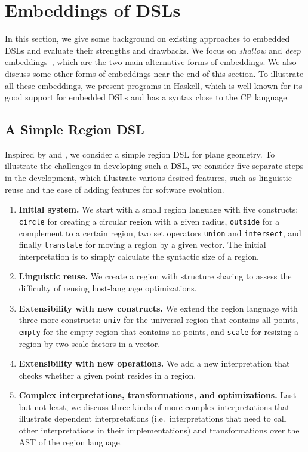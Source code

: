 \section{Embeddings of DSLs} \label{sec:embed}

In this section, we give some background on existing approaches to embedded DSLs
and evaluate their strengths and drawbacks. We focus on \emph{shallow} and \emph{deep}
embeddings~\citep{boulton1992experience}, which are the two main alternative
forms of embeddings. We also discuss some other forms of embeddings near the end
of this section. To illustrate all these embeddings, we present programs in
Haskell, which is well known for its good support for embedded DSLs and has a
syntax close to the CP language.

\subsection{A Simple Region DSL}

Inspired by \citet{hudak1998modular} and \citet{hofer2008polymorphic}, we
consider a simple region DSL for plane geometry. To illustrate the challenges in
developing such a DSL, we consider five separate steps in the development, which
illustrate various desired features, such as linguistic reuse and the ease of
adding features for software evolution.

\begin{enumerate}
\item \textbf{Initial system.}
      We start with a small region language with five constructs:
      \lstinline{circle} for creating a circular region with a given radius,
      \lstinline{outside} for a complement to a certain region,
      two set operators \lstinline{union} and \lstinline{intersect}, and finally
      \lstinline{translate} for moving a region by a given vector.
      The initial interpretation is to simply calculate the syntactic size of a region.
\item \textbf{Linguistic reuse.}
      We create a region with structure sharing to assess the difficulty of
      reusing host-language optimizations.
\item \textbf{Extensibility with new constructs.}
      We extend the region language with three more constructs:
      \lstinline{univ} for the universal region that contains all points,
      \lstinline{empty} for the empty region that contains no points, and
      \lstinline{scale} for resizing a region by two scale factors in a vector.
\item \textbf{Extensibility with new operations.}
      We add a new interpretation that checks whether a given point resides in a region.
\item \textbf{Complex interpretations, transformations, and optimizations.}
      Last but not least, we discuss three kinds of more complex interpretations
      that illustrate dependent interpretations (i.e.~interpretations that need
      to call other interpretations in their implementations) and
      transformations over the AST of the region language. 
\end{enumerate}

